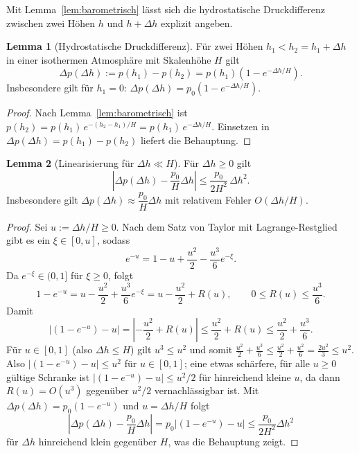 ﻿\documentclass[a4paper,12pt]{article}
\theoremstyle{definition}
\newtheorem{lemma}{Lemma}
\begin{document}
Mit Lemma~\ref{lem:barometrisch} lässt sich die hydrostatische
Druckdifferenz zwischen zwei Höhen $h$ und $h+\Delta h$ explizit angeben.

\begin{lemma}[Hydrostatische Druckdifferenz]
	\label{lem:hydrostatisch}
	Für zwei Höhen $h_1 < h_2 = h_1 + \Delta h$ in einer isothermen
	Atmosphäre mit Skalenhöhe $H$ gilt
	\[
		\Delta p(\Delta h) := p(h_1) - p(h_2)
		= p(h_1)\left(1 - e^{-\Delta h / H}\right).
	\]
	Insbesondere gilt für $h_1 = 0$:
	$\Delta p(\Delta h) = p_0\left(1 - e^{-\Delta h/H}\right)$.
\end{lemma}

\begin{proof}
	Nach Lemma~\ref{lem:barometrisch} ist $p(h_2) = p(h_1) \, e^{-(h_2 -
	h_1)/H} = p(h_1)\, e^{-\Delta h/H}$. Einsetzen in
	$\Delta p(\Delta h) = p(h_1) - p(h_2)$ liefert die Behauptung.
\end{proof}

\begin{lemma}[Linearisierung für $\Delta h \ll H$]
	\label{lem:linearisierung}
	Für $\Delta h \geq 0$ gilt
	\[
		\left| \Delta p(\Delta h) - \frac{p_0}{H}\Delta h \right|
		\leq \frac{p_0}{2H^2}\, \Delta h^2.
	\]
	Insbesondere gilt $\Delta p(\Delta h) \approx \dfrac{p_0}{H}\Delta h$
	mit relativem Fehler $O(\Delta h / H)$.
\end{lemma}

\begin{proof}
	Sei $u := \Delta h / H \geq 0$. Nach dem Satz von Taylor mit
	Lagrange-Restglied gibt es ein $\xi \in [0,u]$, sodass
	\[
		e^{-u} = 1 - u + \frac{u^2}{2} - \frac{u^3}{6}e^{-\xi}.
	\]
	Da $e^{-\xi} \in (0,1]$ für $\xi \geq 0$, folgt
	\[
		1 - e^{-u} = u - \frac{u^2}{2} + \frac{u^3}{6}e^{-\xi}
		= u - \frac{u^2}{2} + R(u), \qquad
		0 \leq R(u) \leq \frac{u^3}{6}.
	\]
	Damit
	\[
		\left|(1-e^{-u}) - u\right|
		= \left|-\frac{u^2}{2} + R(u)\right|
		\leq \frac{u^2}{2} + R(u)
		\leq \frac{u^2}{2} + \frac{u^3}{6}.
	\]
	Für $u \in [0,1]$ (also $\Delta h \leq H$) gilt $u^3 \leq u^2$ und
	somit $\frac{u^2}{2} + \frac{u^3}{6} \leq \frac{u^2}{2} +
	\frac{u^2}{6} = \frac{2u^2}{3} \leq u^2$. Also
	$\left|(1-e^{-u}) - u\right| \leq u^2$ für $u \in [0,1]$; eine etwas
	schärfere, für alle $u \geq 0$ gültige Schranke ist
	$\left|(1-e^{-u})-u\right| \le u^2/2$ für hinreichend kleine $u$, da
	dann $R(u) = O(u^3)$ gegenüber $u^2/2$ vernachlässigbar ist. Mit
	$\Delta p(\Delta h) = p_0(1-e^{-u})$ und $u = \Delta h/H$ folgt
	\[
		\left|\Delta p(\Delta h) - \frac{p_0}{H}\Delta h\right|
		= p_0\left|(1-e^{-u}) - u\right|
		\leq \frac{p_0}{2H^2}\Delta h^2
	\]
	für $\Delta h$ hinreichend klein gegenüber $H$, was die Behauptung
	zeigt. \qedhere
\end{proof}
\end{document}
